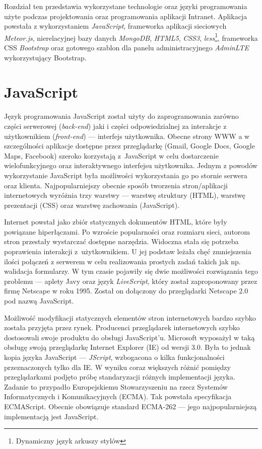 Rozdział ten przedstawia wykorzystane technologie oraz języki programowania użyte podczas projektowania oraz programowania aplikacji Intranet. Aplikacja powstała z wykorzystaniem \emph{JavaScript}, frameworka aplikacji sieciowych \emph{Meteor.js}, nierelacyjnej bazy danych  \emph{MongoDB}, \emph{HTML5}, \emph{CSS3}, \emph{less}\footnote{Dynamiczny język arkuszy stylów}, frameworka CSS \emph{Bootstrap} oraz gotowego szablon dla panelu administracyjnego \emph{AdminLTE} wykorzystujący Bootstrap.

\section{JavaScript}

Język programowania JavaScript został użyty do zaprogramowania zarówno części serwerowej (\textit{back-end}) jaki i części odpowiedzialnej za interakcje z użytkownikiem (\textit{front-end}) --- interfejs użytkownika. Obecne strony WWW a w szczególności aplikacje dostępne przez przeglądarkę (Gmail, Google Docs, Google Maps, Facebook) szeroko korzystają z~JavaScript w celu dostarczenie wielofunkcyjnego oraz interaktywnego interfejsu użytkownika. Jednym z powodów wykorzystanie JavaScript była możliwości wykorzystania go po stornie serwera oraz klienta. Najpopularniejszy obecnie sposób tworzenia stron/aplikacji internetowych wyróżnia trzy warstwy --- warstwę struktury (HTML), warstwę prezentacji (CSS) oraz warstwę zachowania (JavaScript)\cite{stefanov10}.

Internet powstał jako zbiór statycznych dokumentów HTML, które były powiązane hiperłączami. Po wzroście popularności oraz rozmiaru sieci, autorom stron przestały wystarczać dostępne narzędzia. Widoczna stała się potrzeba poprawienia interakcji z~użytkownikiem. U jej podstaw leżała chęć zmniejszenia ilości połączeń z serwerem w celu realizowania prostych zadań takich jak np. walidacja formularzy. W tym czasie pojawiły się dwie możliwości rozwiązania tego problemu --- aplety Javy oraz język \emph{LiveScript}, który został zaproponowany przez firmę Netscape w roku 1995. Został on dołączony do przeglądarki Netscape 2.0 pod nazwą JavaScript\cite{stefanov10}.  

Możliwość modyfikacji statycznych elementów stron internetowych bardzo szybko została przyjęta przez rynek. Producenci przeglądarek internetowych szybko dostosowali swoje produktu do obsługi JavaScript'u. Microsoft wyposażył w taką obsługę swoją przeglądarkę Internet Explorer (IE) od wersji 3.0. Była to jednak kopia języka JavaScript --- \emph{JScript}, wzbogacona o kilka funkcjonalności przeznaczonych tylko dla IE. W wyniku coraz większych różnić pomiędzy przeglądarkami podjęto próbę standaryzacji różnych implementacji języka. Zadanie to przypadło  Europejskiemu Stowarzyszeniu na rzecz Systemów Informatycznych i Komunikacyjnych (ECMA). Tak powstała specyfikacja ECMAScript. Obecnie obowiązuje standard ECMA-262\cite{ecmascriptWiki} --- jego najpopularniejszą implementacją jest JavaScript.  

